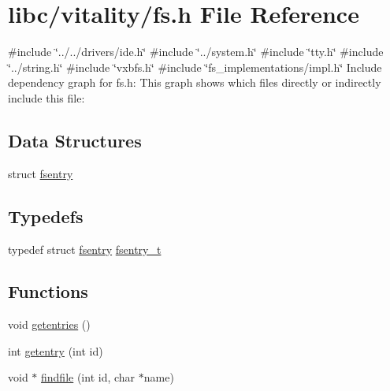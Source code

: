 \hypertarget{a00152}{}\section{libc/vitality/fs.h File Reference}
\label{a00152}
{\ttfamily \#include \char`\"{}../../drivers/ide.\+h\char`\"{}}\newline
{\ttfamily \#include \char`\"{}../system.\+h\char`\"{}}\newline
{\ttfamily \#include \char`\"{}tty.\+h\char`\"{}}\newline
{\ttfamily \#include \char`\"{}../string.\+h\char`\"{}}\newline
{\ttfamily \#include \char`\"{}vxbfs.\+h\char`\"{}}\newline
{\ttfamily \#include \char`\"{}fs\+\_\+implementations/impl.\+h\char`\"{}}\newline
Include dependency graph for fs.\+h\+:
This graph shows which files directly or indirectly include this file\+:
\subsection*{Data Structures}
\begin{DoxyCompactItemize}
\item 
struct \hyperlink{a00272}{fsentry}
\end{DoxyCompactItemize}
\subsection*{Typedefs}
\begin{DoxyCompactItemize}
\item 
typedef struct \hyperlink{a00272}{fsentry} \hyperlink{a00152_a9ccf6560e8aebea3e4402a31e8c0f46b_a9ccf6560e8aebea3e4402a31e8c0f46b}{fsentry\+\_\+t}
\end{DoxyCompactItemize}
\subsection*{Functions}
\begin{DoxyCompactItemize}
\item 
void \hyperlink{a00152_a414110036132977c34813673360e1a63_a414110036132977c34813673360e1a63}{getentries} ()
\item 
int \hyperlink{a00152_a3fb32d07d3bd05144a196c94fc59c0d1_a3fb32d07d3bd05144a196c94fc59c0d1}{getentry} (int id)
\item 
void $\ast$ \hyperlink{a00152_a89d79ab10f0c468a6c0d8403ddf50092_a89d79ab10f0c468a6c0d8403ddf50092}{findfile} (int id, char $\ast$name)
\end{DoxyCompactItemize}
